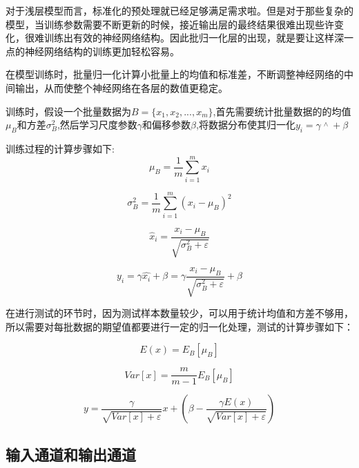 对于浅层模型而言，标准化的预处理就已经足够满足需求啦。但是对于那些复杂的模型，当训练参数需要不断更新的时候，接近输出层的最终结果很难出现些许变化，很难训练出有效的神经网络结构。因此批归一化层的出现，就是要让这样深一点的神经网络结构的训练更加轻松容易。

在模型训练时，批量归一化计算小批量上的均值和标准差，不断调整神经网络的中间输出，从而使整个神经网络在各层的数值更稳定。

训练时，假设一个批量数据为$B = \{ {x_1},{x_2},...,{x_m}\}$,首先需要统计批量数据的的均值${\mu_B}$和方差$\sigma _B^2$,然后学习尺度参数$\gamma$和偏移参数$\beta$,将数据分布使其归一化${y_i} = \gamma \mathop {{x_i}}\limits^ \wedge   + \beta$

训练过程的计算步骤如下:
\begin{equation}
{\mu _B} = \frac{1}{m}\sum\limits_{i = 1}^m {{x_i}}
\end{equation}

\begin{equation}
\sigma _B^2 = \frac{1}{m}\sum\limits_{i = 1}^m {{{\left( {{x_i} - {\mu _B}} \right)}^2}}
\end{equation}

\begin{equation}
{\widehat x_i} = \frac{{{x_i} - {\mu _B}}}{{\sqrt {\sigma _B^2 + \varepsilon } }}
\end{equation}

\begin{equation}
{y_i} = \gamma \widehat {{x_i}} + \beta  = \gamma \frac{{{x_i} - {\mu _B}}}{{\sqrt {\sigma _B^2 + \varepsilon } }} + \beta
\end{equation}

在进行测试的环节时，因为测试样本数量较少，可以用于统计均值和方差不够用，所以需要对每批数据的期望值都要进行一定的归一化处理，测试的计算步骤如下：

\begin{equation}
E(x) = {E_B}\left[ {{\mu _B}} \right]
\end{equation}

\begin{equation}
Var[x] = \frac{m}{{m - 1}}{E_B}[{\mu _B}]
\end{equation}

\begin{equation}
y = \frac{\gamma }{{\sqrt {Var[x] + \varepsilon } }}x + (\beta  - \frac{{\gamma E(x)}}{{\sqrt {Var[x] + \varepsilon } }})
\end{equation}

\subsection{输入通道和输出通道}

